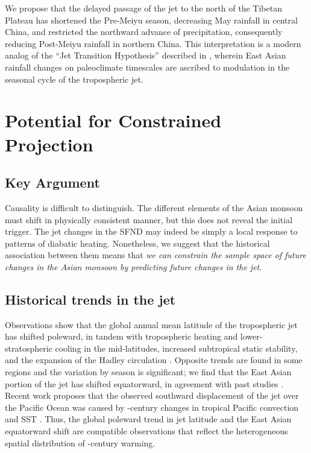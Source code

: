 	 	 
	We propose that the delayed passage of the jet to the north of the Tibetan Plateau has shortened the Pre-Meiyu season, decreasing May rainfall in central China, and restricted the northward advance of precipitation, consequently reducing Post-Meiyu rainfall in northern China. This interpretation is a modern analog of the ``Jet Transition Hypothesis'' described in \citet{Chiang2015}, wherein East Asian rainfall changes on paleoclimate timescales are ascribed to modulation in the seasonal cycle of the tropospheric jet. 	
 		 
\section{Potential for Constrained Projection}

\subsection{Key Argument}
	Causality is difficult to distinguish. The different elements of the Asian monsoon must shift in physically consistent manner, but this does not reveal the initial trigger. The jet changes in the SFND may indeed be simply a local response to patterns of diabatic heating. Nonetheless, we suggest that the historical association between them means that \textit{we can constrain the sample space of future changes in the Asian monsoon by predicting future changes in the jet}.
	
\subsection{Historical trends in the jet}
	Observations show that the global annual mean latitude of the tropospheric jet has shifted poleward, in tandem with tropospheric heating and lower-stratospheric cooling in the mid-latitudes, increased subtropical static stability, and the expansion of the Hadley circulation \citep{Fu2006,Archer2008,Fu2011}. Opposite trends are found in some regions and the variation by season is significant; we find that the East Asian portion of the jet has shifted equatorward, in agreement with past studies \citep{Yu2007, Archer2008}. Recent work proposes that the observed southward displacement of the jet over the Pacific Ocean was caused by -century changes in tropical Pacific convection and SST \citep{Park2014a}. Thus, the global poleward trend in jet latitude and the East Asian equatorward shift are compatible observations that reflect the heterogeneous spatial distribution of -century warming.


